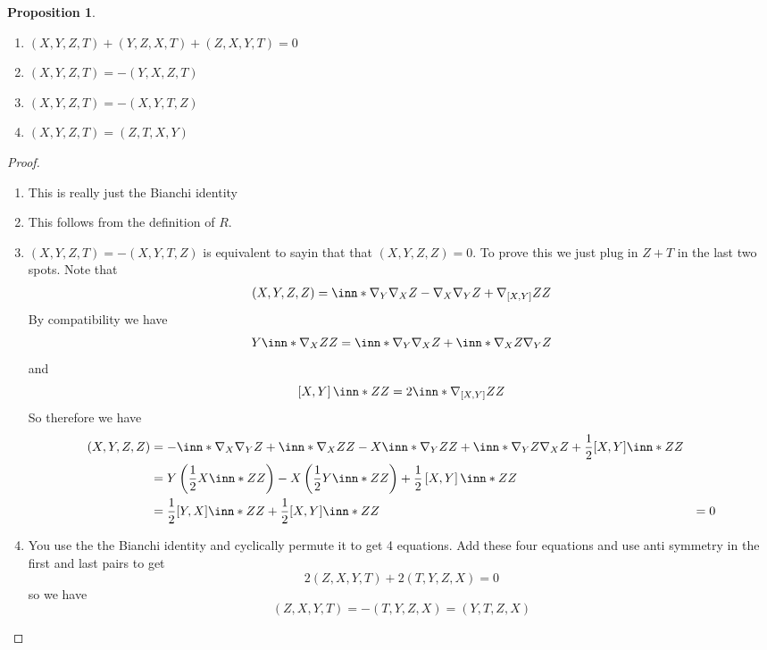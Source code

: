 \documentclass[a4paper]{article}
\newtheorem*{prop}{Proposition}
\begin{document}
 \begin{prop}
   \begin{enumerate}
     \item $(X,Y,Z,T) + (Y,Z,X,T) + (Z,X,Y,T) = 0$ 
     \item $(X,Y,Z,T) = -(Y,X,Z,T)$
     \item $(X,Y,Z,T) = -(X,Y,T,Z)$
     \item $(X,Y,Z,T) = (Z,T,X,Y)$
   \end{enumerate}
 \end{prop}

 \begin{proof}
   \begin{enumerate}
     \item This is really just the Bianchi identity
     \item This follows from the definition of $R$.
     \item $(X,Y,Z,T) = -(X,Y,T,Z)$ is equivalent to sayin that that $(X,Y,Z,Z) = 0$. To prove this we just plug in $Z+T$ in the last two spots. Note that
       \[
         \begin{aligned}
           (X,Y,Z,Z) &=  \inn*{\nabla_Y\nabla_X Z - \nabla_X \nabla_Y Z + \nabla_{[X,Y]}Z}{ Z}  \\
         \end{aligned}
       \]
       By compatibility we have
       \[
         Y \inn*{\nabla_X Z}{Z} = \inn*{\nabla_Y \nabla_X}{Z} + \inn*{\nabla_X Z}{\nabla_Y Z}
       \]
       and
       \[
         \left[ X,Y \right] \inn*{Z}{Z} = 2 \inn*{\nabla_{[X,Y]}Z}{Z}
       \]
       So therefore we have
       \[
         \begin{aligned}
           (X,Y,Z,Z) &= -\inn*{\nabla_X}{\nabla_Y Z} + \inn*{\nabla_X Z}{Z} - X \inn*{\nabla_Y Z}{Z} + \inn*{\nabla_Y Z}{\nabla_X Z} + \frac{1}{2} [X,Y] \inn*{Z}{Z} \\
                     &= Y \left(\frac{1}{2} X \inn*{Z}{Z} \right) - X \left( \frac{1}{2} Y \inn*{Z}{Z} \right) + \frac{1}{2} \left[ X,Y \right] \inn*{Z}{Z} \\
                     &= \frac{1}{2} [Y,X] \inn*{Z}{Z} + \frac{1}{2} [X,Y] \inn*{Z}{Z}
                     &= 0
         \end{aligned}
       \]
     \item You use the the Bianchi identity and cyclically permute it to get 4 equations.  Add these four equations and use anti symmetry in the first and last pairs to get
       \[
         2(Z,X,Y,T) + 2(T,Y,Z,X) = 0
       \]
       so we have
       \[
         (Z,X,Y,T) = -(T,Y,Z,X) = (Y,T,Z,X)
       \]
   \end{enumerate}
  \end{proof}
\end{document}
